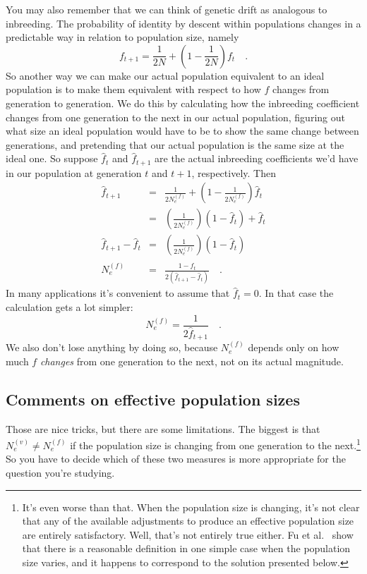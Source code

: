 \documentclass[12pt]{article}
\begin{document}
You may also remember that we can think of genetic drift as analogous
to inbreeding. The probability of identity by descent within
populations changes in a predictable way in relation to population
size, namely
\[
f_{t+1}
   = \frac{1}{2N} + \left(1 - \frac{1}{2N}\right)f_t \quad.
\]
So another way we can make our actual population equivalent to an
ideal population is to make them equivalent with respect to how $f$
changes from generation to generation. We do this by calculating how
the inbreeding coefficient changes from one generation to the next in
our actual population, figuring out what size an ideal population
would have to be to show the same change between generations, and
pretending that our actual population is the same size at the ideal
one. So suppose $\hat f_t$ and $\hat f_{t+1}$ are the actual
inbreeding coefficients we'd have in our population at generation $t$
and $t+1$, respectively. Then
\begin{eqnarray*}
\hat f_{t+1} &=& \frac{1}{2N_e^{(f)}} + \left(1 -
        \frac{1}{2N_e^{(f)}}\right)\hat f_t \\
        &=& \left(\frac{1}{2N_e^{(f)}}\right)(1 - \hat f_t) + \hat f_t \\
\hat f_{t+1} - \hat f_t &=& \left(\frac{1}{2N_e^{(f)}}\right)(1 - \hat
        f_t) \\
N_e^{(f)} &=& \frac{1 - \hat f_t}{2(\hat f_{t+1} - \hat f_t)} \quad .
\end{eqnarray*}
In many applications it's convenient to assume that $\hat f_t = 0$. In
that case the calculation gets a lot simpler:
\[
N_e^{(f)} = \frac{1}{2\hat f_{t+1}} \quad .
\]
We also don't lose anything by doing so, because $N_e^{(f)}$ depends
only on how much $f$ {\it changes\/} from one generation to the next,
not on its actual magnitude.

\subsection*{Comments on effective population sizes}

Those are nice tricks, but there are some limitations. The biggest is
that $N_e^{(v)} \ne N_e^{(f)}$ if the population size is changing from
one generation to the next.\footnote{It's even worse than that. When
  the population size is changing, it's not clear that any of the
  available adjustments to produce an effective population size are
  entirely satisfactory. Well, that's not entirely true either. Fu et
  al.~\cite{Fu-etal-2003} show that there is a reasonable definition
  in one simple case when the population size varies, and it happens
  to correspond to the solution presented below.} So you have to
decide which of these two measures is more appropriate for the
question you're studying.
\end{document}
